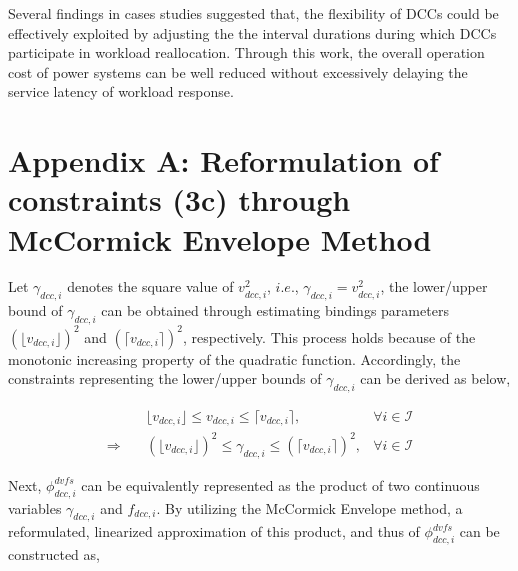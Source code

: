 \documentclass[lettersize,journal]{IEEEtran}
\begin{document}
Several findings in cases studies suggested that, the flexibility of DCCs could be effectively exploited by adjusting the the interval durations during which DCCs participate in workload reallocation. Through this work, the overall operation cost of power systems can be well reduced without excessively delaying the service latency of workload response.


\section{Appendix A: Reformulation of constraints (3c) through McCormick Envelope Method}
Let $\gamma_{dcc,i}$ denotes the square value of \(v_{dcc,i}^{2}\), $i.e.$, \(\gamma_{dcc,i} = v_{dcc,i}^{2}\), the lower/upper bound of $\gamma_{dcc,i}$ can be obtained through estimating bindings parameters \((\lfloor v_{dcc,i} \rfloor)^2\) and \((\lceil v_{dcc,i} \rceil)^2\), respectively. This process holds because of the monotonic increasing property of the quadratic function. Accordingly, the constraints representing the lower/upper bounds of \(\gamma_{dcc,i}\)  can be derived as below,

\vspace{-0.25cm}
\begin{subequations}
\begin{align}
  & \lfloor v_{dcc,i} \rfloor \leq v_{dcc,i} \leq \lceil v_{dcc,i} \rceil, & \forall i \in \mathcal{I}\\
  \Rightarrow \quad & (\lfloor v_{dcc,i} \rfloor )^2 \leq \gamma_{dcc,i}  \leq (\lceil v_{dcc,i} \rceil)^2, &\forall i \in \mathcal{I}
\end{align}
\end{subequations}

Next, $\phi_{dcc,i}^{dvfs}$ can be equivalently represented as the product of two continuous variables $\gamma_{dcc,i}$ and $f_{dcc,i}$. By utilizing the McCormick Envelope method, a reformulated, linearized approximation of this product, and thus of $\phi_{dcc,i}^{dvfs}$ can be constructed as,
\end{document}
